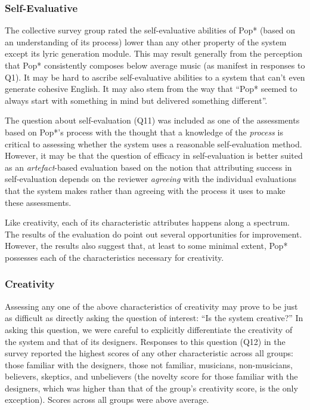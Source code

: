 \documentclass[phd,electronic,oneside,twosidetoc,letterpaper,chaptercenter,parttop,lof,lot]{byumsphd}
\begin{document}
\subsubsection{Self-Evaluative}
The collective survey group rated the self-evaluative abilities of Pop* (based on an understanding of its process) lower than any other property of the system except its lyric generation module. This may result generally from the perception that Pop* consistently composes below average music (as manifest in responses to Q1). It may be hard to ascribe self-evaluative abilities to a system that can't even generate cohesive English. It may also stem from the way that ``Pop* seemed to always start with something in mind but delivered something different''.

The question about self-evaluation (Q11) was included as one of the assessments based on Pop*'s process with the thought that a knowledge of the \textit{process} is critical to assessing whether the system uses a reasonable self-evaluation method. However, it may be that the question of efficacy in self-evaluation is better suited as an \textit{artefact}-based evaluation based on the notion that attributing success in self-evaluation depends on the reviewer \textit{agreeing} with the individual evaluations that the system makes rather than agreeing with the process it uses to make these assessments. 
\newline

Like creativity, each of its characteristic attributes happens along a spectrum. The results of the evaluation do point out several opportunities for improvement. However, the results also suggest that, at least to some minimal extent, Pop* possesses each of the characteristics necessary for creativity.

\subsubsection{Creativity}

Assessing any one of the above characteristics of creativity may prove to be just as difficult as directly asking the question of interest: ``Is the system creative?'' In asking this question, we were careful to explicitly differentiate the creativity of the system and that of its designers. Responses to this question (Q12) in the survey reported the highest scores of any other characteristic across all groups: those familiar with the designers, those not familiar, musicians, non-musicians, believers, skeptics, and unbelievers (the novelty score for those familiar with the designers, which was higher than that of the group's creativity score, is the only exception). Scores across all groups were above average.
\end{document}
